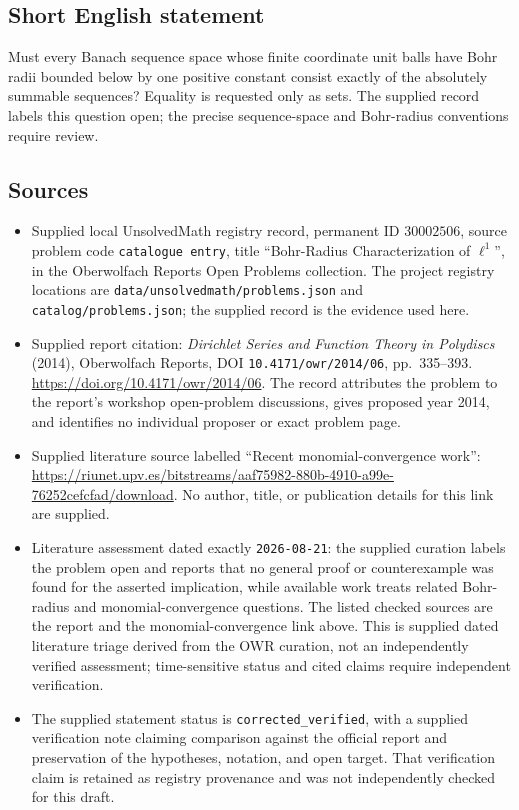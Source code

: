 \documentclass[11pt]{article}
\begin{document}
\subsection{Short English statement}
Must every Banach sequence space whose finite coordinate unit balls have Bohr radii bounded below by one positive constant consist exactly of the absolutely summable sequences? Equality is requested only as sets. The supplied record labels this question open; the precise sequence-space and Bohr-radius conventions require review.
\subsection{Sources}
\begin{itemize}
\item Supplied local UnsolvedMath registry record, permanent ID \(30002506\), source problem code \texttt{catalogue entry}, title ``Bohr-Radius Characterization of \(\ell^1\)'', in the Oberwolfach Reports Open Problems collection. The project registry locations are \texttt{data/unsolvedmath/problems.json} and \texttt{catalog/problems.json}; the supplied record is the evidence used here.
\item Supplied report citation: \emph{Dirichlet Series and Function Theory in Polydiscs} (2014), Oberwolfach Reports, DOI \texttt{10.4171/owr/2014/06}, pp.\ 335--393. \url{https://doi.org/10.4171/owr/2014/06}. The record attributes the problem to the report's workshop open-problem discussions, gives proposed year 2014, and identifies no individual proposer or exact problem page.
\item Supplied literature source labelled ``Recent monomial-convergence work'': \url{https://riunet.upv.es/bitstreams/aaf75982-880b-4910-a99e-76252cefcfad/download}. No author, title, or publication details for this link are supplied.
\item Literature assessment dated exactly \texttt{2026-08-21}: the supplied curation labels the problem open and reports that no general proof or counterexample was found for the asserted implication, while available work treats related Bohr-radius and monomial-convergence questions. The listed checked sources are the report and the monomial-convergence link above. This is supplied dated literature triage derived from the OWR curation, not an independently verified assessment; time-sensitive status and cited claims require independent verification.
\item The supplied statement status is \texttt{corrected\_verified}, with a supplied verification note claiming comparison against the official report and preservation of the hypotheses, notation, and open target. That verification claim is retained as registry provenance and was not independently checked for this draft.
\end{itemize}
\end{document}
